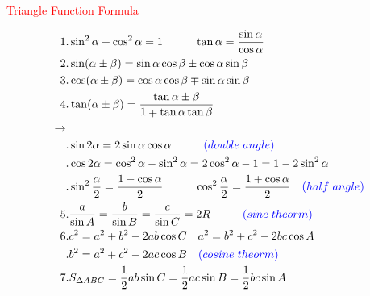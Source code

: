\documentclass{standalone}
\begin{document}
\begin{minipage}[b][14cm][t]{1.00\textwidth}
\begin{center}\textcolor{red}{\huge{Triangle Function Formula}}\end{center}
\begin{Large}\begin{align*}
1&.\sin^2\alpha+\cos^2\alpha = 1\hspace{1cm}\tan\alpha=\frac{\sin\alpha}{\cos\alpha}\\
2&.\sin(\alpha\pm\beta)=\sin\alpha\cos\beta\pm\cos\alpha\sin\beta\\
3&.\cos(\alpha\pm\beta)=\cos\alpha\cos\beta\mp\sin\alpha\sin\beta\\
4&.\tan(\alpha\pm\beta)=\frac{\tan\alpha\pm\beta}{1\mp\tan\alpha\tan\beta}\\
\rightarrow\\
&.\sin2\alpha=2\sin\alpha\cos\alpha\hspace{1cm}\textcolor{blue}{(double\hspace{3pt}angle)}\\
&.\cos2\alpha=\cos^2\alpha-\sin^2\alpha=2\cos^2\alpha-1=1-2\sin^2\alpha\\
&.\sin^2\frac{\alpha}{2}=\frac{1-\cos\alpha}{2}\hspace{1cm}\cos^2\frac{\alpha}{2}=\frac{1+\cos\alpha}{2}\hspace{10pt}\textcolor{blue}{(half\hspace{3pt}angle)}\\
5&.\frac{a}{\sin{A}}=\frac{b}{\sin{B}}=\frac{c}{\sin{C}}=2R\hspace{1cm}\textcolor{blue}{(sine\hspace{3pt}theorm)}\\
6&.c^2=a^2+b^2-2ab\cos{C}\hspace{10pt}a^2=b^2+c^2-2bc\cos{A}\\
 &.b^2=a^2+c^2-2ac\cos{B}\hspace{10pt}\textcolor{blue}{(cosine\hspace{3pt}theorm)}\\
7&.S_{\Delta{ABC}}=\frac{1}{2}ab\sin{C}=\frac{1}{2}ac\sin{B}=\frac{1}{2}bc\sin{A}
\end{align*}\end{Large}
\end{minipage}
\end{document}
